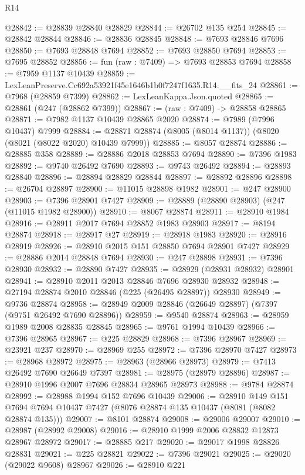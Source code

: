 \begin{lexlean}{R14}
\begin{coremodule}
@28842 := @28839 @28840 @28829
@28844 := @26702 @135 @254
@28845 := @28842 @28844
@28846 := @28836 @28845
@28848 := @7693 @28846 @7696
@28850 := @7693 @28848 @7694
@28852 := @7693 @28850 @7694
@28853 := @7695 @28852
@28856 := fun (raw : @7409) => @7693 @28853 @7694
@28858 := @7959 @1137 @10439
@28859 := LexLeanPreserve.Cc692a53921f45e1646b1b0f7247f1635.R14.__fits_24
@28861 := @7968 (@28859 @7399)
@28862 := LexLeanKappa.Json.quoted
@28865 := @28861 (@247 (@28862 @7399))
@28867 := (raw : @7409) -> @28858 @28865
@28871 := @7982 @1137 @10439 @28865 @2020
@28874 := @7989 (@7996 @10437) @7999
@28884 := @28871 @28874 (@8005 (@8014 @1137)) (@8020 (@8021 (@8022 @2020) @10439 @7999))
@28885 := @8057 @28874
@28886 := @28885 @358
@28889 := @28886 @2018 @28853 @7694
@28890 := @7396 @1983
@28892 := @9740 @26492 @7690
@28893 := @9743 @26492
@28894 := @28893 @28840
@28896 := @28894 @28829 @28844
@28897 := @28892 @28896
@28898 := @26704 @28897
@28900 := @11015 @28898 @1982
@28901 := @247 @28900
@28903 := @7396 @28901 @7427
@28909 := @28889 (@28890 @28903) (@247 (@11015 @1982 @28900))
@28910 := @8067 @28874
@28911 := @28910 @1984
@28916 := @28911 @2017 @7694 @28852 @1983 @28903
@28917 := @8194 @28874
@28918 := @28917 @27
@28919 := @28918 @1983
@28920 := @28916 @28919
@28926 := @28910 @2015 @151 @28850 @7694 @28901 @7427
@28929 := @28886 @2014 @28848 @7694
@28930 := @247 @28898
@28931 := @7396 @28930
@28932 := @28890 @7427
@28935 := @28929 (@28931 @28932) @28901
@28941 := @28910 @2011 @2013 @28846 @7696 @28930 @28932
@28948 := @27194 @28874 @2010 @28846 (@225 (@26495 @28897)) @28930
@28949 := @9736 @28874
@28958 := @28949 @2009 @28846 (@26649 @28897) (@7397 (@9751 @26492 @7690 @28896))
@28959 := @9540 @28874
@28963 := @28959 @1989 @2008 @28835 @28845
@28965 := @9761 @1994 @10439
@28966 := @7396 @28965
@28967 := @225 @28829
@28968 := @7396 @28967
@28969 := @23921 @237
@28970 := @28969 @255
@28972 := @7396 @28970 @7427
@28973 := @28968 @28972
@28975 := @28963 (@28966 @28973)
@28979 := @7413 @26492 @7690 @26649 @7397
@28981 := @28975 (@28979 @28896)
@28987 := @28910 @1996 @2007 @7696 @28834 @28965 @28973
@28988 := @9784 @28874
@28992 := @28988 @1994 @152 @7696 @10439
@29006 := @28910
    @149
    @151
    @7694
    @7694
    @10437
    @7427
    (@8076 @28874 @135 @10437 (@8081 (@8082 @28874 @135)))
@29007 := @8101 @28874
@29008 := @29006 @29007
@29010 := @28987 (@28992 @29008)
@29016 := @28910 @1999 @2006 @28832 @12873 @28967 @28972
@29017 := @28885 @217
@29020 := @29017 @1998 @28826 @28831
@29021 := @225 @28821
@29022 := @7396 @29021
@29025 := @29020 (@29022 @9608) @28967
@29026 := @28910 @221

\end{coremodule}
\end{lexlean}
